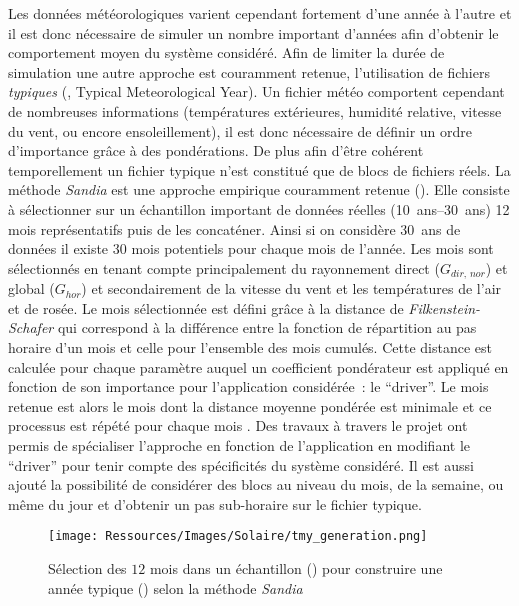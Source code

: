 Les données météorologiques varient cependant fortement d’une année à l’autre et il est
donc nécessaire de simuler un nombre important d’années afin d’obtenir le comportement
moyen du système considéré. Afin de limiter la durée de simulation une autre approche est
couramment retenue, l’utilisation de fichiers \textit{typiques} (, Typical
Meteorological Year). Un fichier météo comportent cependant de nombreuses informations
(températures extérieures, humidité relative, vitesse du vent, ou encore ensoleillement),
il est donc nécessaire de définir un ordre d’importance grâce à des pondérations. De plus
afin d’être cohérent temporellement un fichier typique n’est constitué que de blocs de
fichiers réels. La méthode \textit{Sandia} \parencite{Hall1978} est une approche empirique
couramment retenue (). Elle consiste à sélectionner sur un
échantillon important de données réelles (\SIrange{10}{30}{ans}) 12 mois représentatifs
puis de les concaténer. Ainsi si on considère \SI{30}{ans} de données il existe $30$ mois
potentiels pour chaque mois de l’année. Les mois sont sélectionnés en tenant compte
principalement du rayonnement direct ($G_{dir,\,nor}$) et global ($G_{hor}$) et
secondairement de la vitesse du vent et les températures de l’air et de rosée. Le mois
sélectionnée est défini grâce à la distance de \textit{Filkenstein-Schafer} qui correspond
à la différence entre la fonction de répartition au pas horaire d’un mois et celle pour
l’ensemble des mois cumulés. Cette distance est calculée pour chaque paramètre auquel un
coefficient pondérateur est appliqué en fonction de son importance pour l’application
considérée~: le \enquote{driver}. Le mois retenue est alors le mois dont la distance
moyenne pondérée est minimale et ce processus est répété pour chaque mois \parencite{Wilcox2008}.
Des travaux à travers le projet 
ont permis de spécialiser l’approche en fonction de l’application en modifiant le
\enquote{driver} pour tenir compte des spécificités du système considéré. Il est aussi
ajouté la possibilité de considérer des blocs au niveau du mois, de la semaine, ou même du
jour et d’obtenir un pas sub-horaire sur le fichier typique.

\begin{figure}
    \centering
    \texttt{[image: Ressources/Images/Solaire/tmy\_generation.png]}
    \caption{Sélection des $12$ mois dans un échantillon () pour
             construire une année typique () selon la méthode \textit{Sandia}}
    \label{fig:methode_sandia}
\end{figure}

